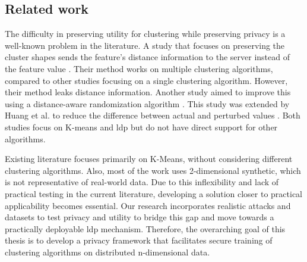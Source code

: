 \newpage

\subsection*{Related work}
The difficulty in preserving utility for clustering while preserving privacy is a well-known problem in the literature.
A study that focuses on preserving the cluster shapes sends the feature’s distance information to the server instead of the feature value \citep{sun_distributed_2019}.
Their method works on multiple clustering algorithms, compared to other studies focusing on a single clustering algorithm.
However, their method leaks distance information. Another study aimed to improve this using a distance-aware randomization algorithm \cite{xia_distributed_2020}.
This study was extended by Huang et al. to reduce the difference between actual and perturbed values \citep{9679364}.
Both studies focus on K-means and \gls{ldp} but do not have direct support for other algorithms. \newline

Existing literature focuses primarily on K-Means, without considering different clustering algorithms.
Also, most of the work uses 2-dimensional synthetic, which is not representative of real-world data.
Due to this inflexibility and lack of practical testing in the current literature, developing a solution closer to practical applicability becomes essential.
Our research incorporates realistic attacks and datasets to test privacy and utility to bridge this gap and move towards a practically deployable \gls{ldp} mechanism.
Therefore, the overarching goal of this thesis is to develop a privacy framework that facilitates secure training of clustering algorithms on distributed n-dimensional data.

